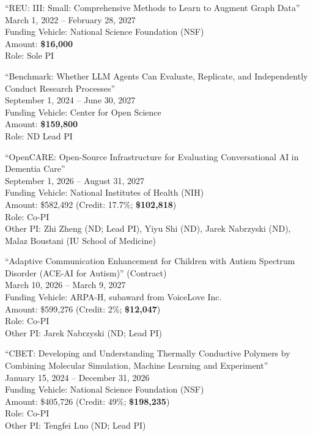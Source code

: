 \documentclass[10pt]{article}
\newenvironment{myindentpar}[1]%
{\begin{list}{}%
         {\setlength{\leftmargin}{#1}}%
         \item[]%
}
{\end{list}}
\newcounter{list}
\begin{document}
\begin{myindentpar}{0.75cm}
\hspace{-0.75cm}``REU: III: Small: Comprehensive Methods to Learn to Augment Graph Data'' \\
March 1, 2022 -- February 28, 2027 \\
Funding Vehicle: National Science Foundation (NSF) \\
Amount: \textbf{\$16,000} \\
Role: {Sole PI}

\hspace{-0.75cm}``Benchmark: Whether LLM Agents Can Evaluate, Replicate, and Independently Conduct Research Processes'' \\
September 1, 2024 -- June 30, 2027 \\
Funding Vehicle: Center for Open Science \\
Amount: \textbf{\$159,800} \\
Role: {ND Lead PI}

\hspace{-0.75cm}``OpenCARE: Open-Source Infrastructure for Evaluating Conversational AI in Dementia
Care'' \\
September 1, 2026 -- August 31, 2027 \\
Funding Vehicle: National Institutes of Health (NIH) \\
Amount: \$582,492 (Credit: 17.7\%; \textbf{\$102,818}) \\
Role: {Co-PI} \\
Other PI: Zhi Zheng (ND; Lead PI), Yiyu Shi (ND), Jarek Nabrzyski (ND), Malaz Boustani (IU School of Medicine)

\hspace{-0.75cm}``Adaptive Communication Enhancement for Children with Autism Spectrum Disorder (ACE-AI for Autism)'' (Contract) \\
March 10, 2026 -- March 9, 2027 \\
Funding Vehicle: ARPA-H, subaward from VoiceLove Inc. \\
Amount: \$599,276 (Credit: 2\%; \textbf{\$12,047}) \\
Role: {Co-PI} \\
Other PI: Jarek Nabrzyski (ND; Lead PI)

\hspace{-0.75cm}``CBET: Developing and Understanding Thermally Conductive Polymers by Combining Molecular Simulation, Machine Learning and Experiment'' \\
January 15, 2024 -- December 31, 2026 \\
Funding Vehicle: National Science Foundation (NSF) \\
Amount: \$405,726 (Credit: 49\%; \textbf{\$198,235}) \\
Role: {Co-PI} \\
Other PI: Tengfei Luo (ND; Lead PI)


\end{myindentpar}
\end{document}
